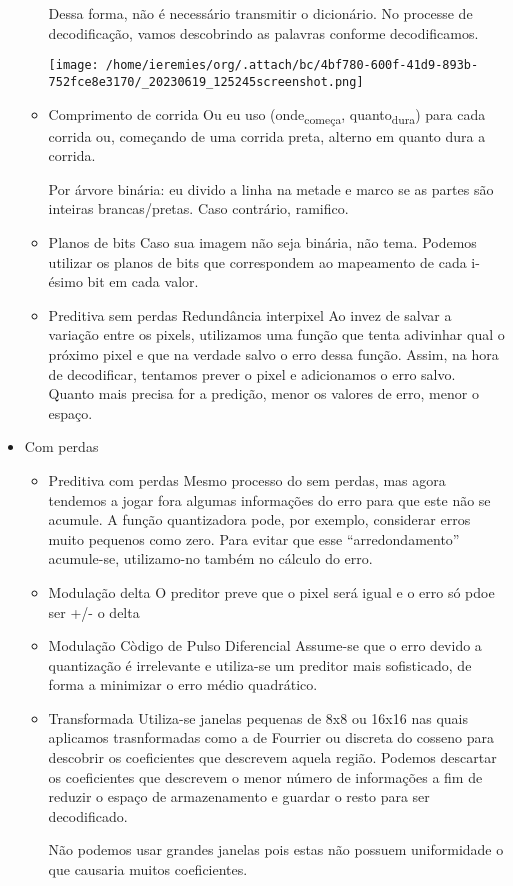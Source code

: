 \documentclass[twocolumn, 9pt]{article}
\begin{document}
\begin{itemize}
\begin{itemize}
Dessa forma, não é necessário transmitir o dicionário. No processe de decodificação, vamos descobrindo as palavras conforme decodificamos.
\begin{center}
\texttt{[image: /home/ieremies/org/.attach/bc/4bf780-600f-41d9-893b-752fce8e3170/\_20230619\_125245screenshot.png]}
\end{center}
\item Comprimento de corrida
\label{sec:org2ace435}
Ou eu uso (onde\textsubscript{começa}, quanto\textsubscript{dura}) para cada corrida ou, começando de uma corrida preta, alterno em quanto dura a corrida.

Por árvore binária: eu divido a linha na metade e marco se as partes são inteiras brancas/pretas. Caso contrário, ramifico.
\item Planos de bits
\label{sec:org1a1f8d4}
Caso sua imagem não seja binária, não tema. Podemos utilizar os planos de bits que correspondem ao mapeamento de cada i-ésimo bit em cada valor.
\item Preditiva sem perdas
\label{sec:org27cbd60}
Redundância interpixel
Ao invez de salvar a variação entre os pixels, utilizamos uma função que tenta adivinhar qual o próximo pixel e que na verdade salvo o erro dessa função. Assim, na hora de decodificar, tentamos prever o pixel e adicionamos o erro salvo.
Quanto mais precisa for a predição, menor os valores de erro, menor o espaço.
\end{itemize}
\item Com perdas
\label{sec:orgec84ca4}
\begin{itemize}
\item Preditiva com perdas
\label{sec:org6775b38}
Mesmo processo do sem perdas, mas agora tendemos a jogar fora algumas informações do erro para que este não se acumule. A função quantizadora pode, por exemplo, considerar erros muito pequenos como zero. Para evitar que esse ``arredondamento'' acumule-se, utilizamo-no também no cálculo do erro.
\item Modulação delta
\label{sec:org5fdac09}
O preditor preve que o pixel será igual e o erro só pdoe ser +/- o delta
\item Modulação Còdigo de Pulso Diferencial
\label{sec:org9a9bb65}
Assume-se que o erro devido a quantização é irrelevante e utiliza-se um preditor mais sofisticado, de forma a minimizar o erro médio quadrático.
\item Transformada
\label{sec:org8055563}
Utiliza-se janelas pequenas de 8x8 ou 16x16 nas quais aplicamos trasnformadas como a de Fourrier ou discreta do cosseno para descobrir os coeficientes que descrevem aquela região. Podemos descartar os coeficientes que descrevem o menor número de informações a fim de reduzir o espaço de armazenamento e guardar o resto para ser decodificado.

Não podemos usar grandes janelas pois estas não possuem uniformidade o que causaria muitos coeficientes.
\end{itemize}
\end{itemize}
\end{document}
